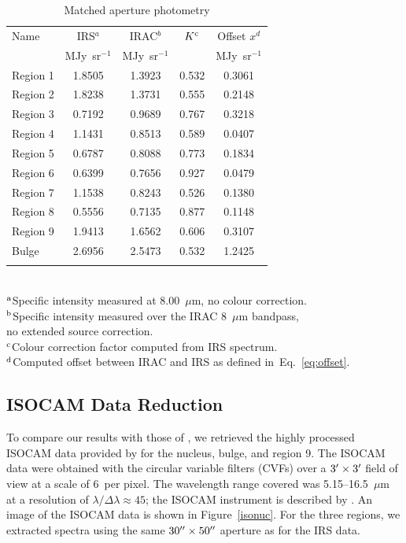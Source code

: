 \begin{table}
 \centering
 \begin{minipage}{100mm}
\caption{Matched aperture photometry}
  \begin{tabular}{lcccc}
  \hline{Name}&{IRS$^{a}$}&{IRAC$^{b}$}&{$K^{\rm c}$}&{Offset $x^d$} \\ 
{} & { MJy~sr$^{-1}$} & { MJy~sr$^{-1}$} & &  MJy~sr$^{-1}$
   \\
 \hline
 Region 1 & 1.8505 & 1.3923 & 0.532 & 0.3061
 \\ Region 2  & 1.8238 & 1.3731 & 0.555 & 0.2148
 \\ Region 3 & 0.7192 & 0.9689 & 0.767 & 0.3218
 \\ Region 4 & 1.1431 & 0.8513 & 0.589 & 0.0407
 \\  Region 5 & 0.6787 & 0.8088 & 0.773 & 0.1834
 \\  Region 6  & 0.6399 & 0.7656 & 0.927 & 0.0479
 \\  Region 7  & 1.1538 & 0.8243 & 0.526 & 0.1380
 \\ Region 8 & 0.5556 & 0.7135 & 0.877 & 0.1148
 \\  Region 9 & 1.9413 & 1.6562 & 0.606 & 0.3107 
 \\ Bulge & 2.6956 & 2.5473 & 0.532 & 1.2425\\
\hline
 \label{colourK}
\end{tabular}\\
 {$^{\rm a}$Specific intensity measured at 8.00~$\mu$m, no colour correction.\\
 $^{\rm b}$Specific intensity measured over the IRAC 8~$\mu$m bandpass,\\ no extended source correction.\\
$^{\rm c}$Colour correction factor computed from IRS spectrum.\\
 $^{\rm d}$Computed offset between IRAC and IRS as defined in~Eq.~\ref{eq:offset}. }
\end{minipage}
\end{table}

	


\subsection{ISOCAM Data Reduction}
\label{sect:iso_data}

To compare our results with those of  \citet{1998Cesarsky}, we retrieved the highly processed ISOCAM data provided by \citet{Boulanger_F_2005}  
for the nucleus, bulge, and region 9. 
The ISOCAM data were obtained with the circular variable filters (CVFs) over a $3\hbox{$^\prime$} \times 3\hbox{$^\prime$}$ field of view at a scale of 6\arcsec\ per pixel. 
The wavelength range covered was 5.15--16.5~$\mu$m at a resolution of $\lambda/\Delta \lambda \approx 45$; the ISOCAM instrument is described by \citet{cesarsky1996}.
An image of the ISOCAM data is shown in Figure~\ref{isonuc}.  For the three regions, we extracted spectra using the same 
$30\hbox{$^{\prime\prime}$}\times50\hbox{$^{\prime\prime}$}$ aperture as for the IRS data. 

